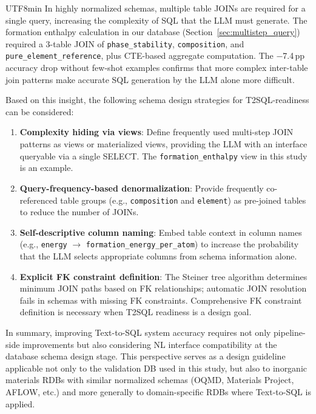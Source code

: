 \documentclass[sn-mathphys,Numbered]{sn-jnl}
\begin{document}
\begin{CJK}{UTF8}{min}
In highly normalized schemas, multiple table JOINs are required
for a single query, increasing the complexity of SQL that the LLM
must generate.
The formation enthalpy calculation in our database
(Section~\ref{sec:multistep_query}) required a 3-table JOIN of
\texttt{phase\_stability}, \texttt{composition}, and
\texttt{pure\_element\_reference}, plus CTE-based aggregate
computation.
The $-$7.4\,pp accuracy drop without few-shot examples confirms
that more complex inter-table join patterns make accurate SQL
generation by the LLM alone more difficult.

Based on this insight, the following schema design strategies for
T2SQL-readiness can be considered:
\begin{enumerate}
  \item \textbf{Complexity hiding via views}:
    Define frequently used multi-step JOIN patterns as views or
    materialized views, providing the LLM with an interface
    queryable via a single SELECT.
    The \texttt{formation\_enthalpy} view in this study is an
    example.
  \item \textbf{Query-frequency-based denormalization}:
    Provide frequently co-referenced table groups
    (e.g., \texttt{composition} and \texttt{element}) as
    pre-joined tables to reduce the number of JOINs.
  \item \textbf{Self-descriptive column naming}:
    Embed table context in column names
    (e.g., \texttt{energy} $\to$ \texttt{formation\_energy\_per\_atom})
    to increase the probability that the LLM selects appropriate
    columns from schema information alone.
  \item \textbf{Explicit FK constraint definition}:
    The Steiner tree algorithm determines minimum JOIN paths based
    on FK relationships; automatic JOIN resolution fails in schemas
    with missing FK constraints.
    Comprehensive FK constraint definition is necessary when
    T2SQL readiness is a design goal.
\end{enumerate}

In summary, improving Text-to-SQL system accuracy requires not
only pipeline-side improvements but also considering NL interface
compatibility at the database schema design stage.
This perspective serves as a design guideline applicable not only
to the validation DB used in this study, but also to inorganic
materials RDBs with similar normalized schemas
(OQMD, Materials Project, AFLOW, etc.) and more generally to
domain-specific RDBs where Text-to-SQL is applied.


\end{CJK}
\end{document}
